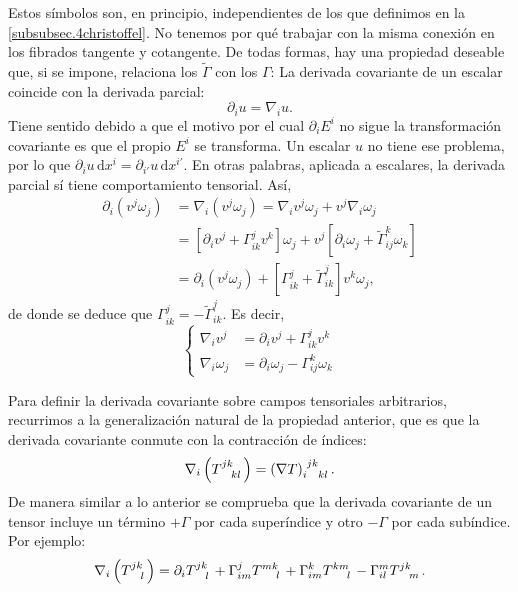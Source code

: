 Estos símbolos son, en principio, independientes de los que definimos en la \cref{subsubsec.4christoffel}. No tenemos por qué trabajar con la misma conexión en los fibrados tangente y cotangente. De todas formas, hay una propiedad deseable que, si se impone, relaciona los \(\tilde{\Gamma}\) con los \(\Gamma\): La derivada covariante de un escalar coincide con la derivada parcial:
\begin{equation}
    \partial_i u = \nabla_i u.
\end{equation}
Tiene sentido debido a que el motivo por el cual \(\partial_i E^i\) no sigue la transformación covariante es que el propio \(E^i\) se transforma. Un escalar \(u\) no tiene ese problema, por lo que \(\partial_i u \,\mathrm{d}x^i = \partial_{i'} u \,\mathrm{d}x^{i'}\). En otras palabras, aplicada a escalares, la derivada parcial sí tiene comportamiento tensorial. Así,
\begin{align}
    \nonumber
    \partial_i \left(v^j \omega_j\right) &= \nabla_i \left(v^j \omega_j\right) = \nabla_i v^j \omega_j + v^j\nabla_i \omega_j \\
    \nonumber
    &= \left[\partial_i v^j + \Gamma^j_{ik}v^k\right] \omega_j + v^j \left[\partial_i \omega_j + \tilde{\Gamma}^k_{ij}\omega_k\right] \\
    &= \partial_i \left(v^j \omega_j\right) + \left[\Gamma^j_{ik} +  \tilde{\Gamma}^j_{ik}\right]v^k\omega_j,
\end{align}
de donde se deduce que \(\Gamma^j_{ik} = -\tilde{\Gamma}^j_{ik}\). Es decir, 
\begin{equation*}
    \left\{
    \begin{aligned}
        \nabla_i v^j &= \partial_i v^j + \Gamma^j_{ik}v^k\\
        \nabla_i \omega_j &= \partial_i \omega_j - \Gamma^k_{ij}\omega_k
    \end{aligned}
    \right.
\end{equation*}

Para definir la derivada covariante sobre campos tensoriales arbitrarios, recurrimos a la generalización natural de la propiedad anterior, que es que la derivada covariante conmute con la contracción de índices:
\begin{equation}
    \nabla_i\left(\tensor{T}{^j^k_k_l}\right) = \tensor{\left(\nabla T\right)}{_i^j^k_k_l}.
\end{equation}
De manera similar a lo anterior se comprueba que la derivada covariante de un tensor incluye un término \(+\Gamma\) por cada superíndice y otro \(-\Gamma\) por cada subíndice. Por ejemplo:
\begin{equation}
    \nabla_i\left(\tensor{T}{^j^k_l}\right) = \partial_i \tensor{T}{^j^k_l} + \Gamma^{j}_{im} \tensor{T}{^m^k_l} + \Gamma^{k}_{im} \tensor{T}{^k^m_l} - \Gamma^{m}_{il} \tensor{T}{^j^k_m}. 
\end{equation}


